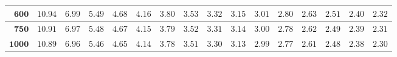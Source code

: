 \begin{customTableWrapper}{1.4}
\begin{longtable}{|r|r|r|r|r|r|r|r|r|r|r|r|r|r|r|r|}
    ${\mathbf{600}}$  & ${10.94}$   & ${6.99}$   & ${5.49}$   & ${4.68}$   & ${4.16}$   & ${3.80}$   & ${3.53}$   & ${3.32}$   & ${3.15}$   & ${3.01}$   & ${2.80}$   & ${2.63}$   & ${2.51}$   & ${2.40}$   & ${2.32}$   \\ \hline 
    ${\mathbf{750}}$  & ${10.91}$   & ${6.97}$   & ${5.48}$   & ${4.67}$   & ${4.15}$   & ${3.79}$   & ${3.52}$   & ${3.31}$   & ${3.14}$   & ${3.00}$   & ${2.78}$   & ${2.62}$   & ${2.49}$   & ${2.39}$   & ${2.31}$   \\ \hline 
    ${\mathbf{1000}}$  & ${10.89}$   & ${6.96}$   & ${5.46}$   & ${4.65}$   & ${4.14}$   & ${3.78}$   & ${3.51}$   & ${3.30}$   & ${3.13}$   & ${2.99}$   & ${2.77}$   & ${2.61}$   & ${2.48}$   & ${2.38}$   & ${2.30}$   \\ \hline
\end{longtable}
\end{customTableWrapper}
\changefontsizes{10pt}

\setlength{\LTleft}{0in} %
\setlength{\LTright}{0in} %


\newpage

